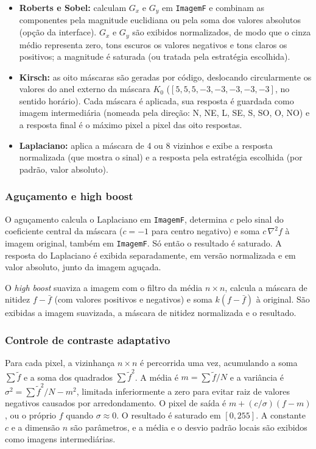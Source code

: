 \documentclass[11pt,a4paper]{article}
\begin{document}
\begin{itemize}
  \item \textbf{Roberts e Sobel:} calculam $G_x$ e $G_y$ em \texttt{ImagemF} e combinam as
        componentes pela magnitude euclidiana ou pela soma dos valores absolutos (opção da
        interface). $G_x$ e $G_y$ são exibidos normalizados, de modo que o cinza médio
        representa zero, tons escuros os valores negativos e tons claros os positivos; a
        magnitude é saturada (ou tratada pela estratégia escolhida).
  \item \textbf{Kirsch:} as oito máscaras são geradas por código, deslocando circularmente os
        valores do anel externo da máscara $K_0$ ($[5, 5, 5, -3, -3, -3, -3, -3]$, no sentido
        horário). Cada máscara é aplicada, sua resposta é guardada como imagem intermediária
        (nomeada pela direção: N, NE, L, SE, S, SO, O, NO) e a resposta final é o máximo
        pixel a pixel das oito respostas.
  \item \textbf{Laplaciano:} aplica a máscara de 4 ou 8 vizinhos e exibe a resposta
        normalizada (que mostra o sinal) e a resposta pela estratégia escolhida (por padrão,
        valor absoluto).
\end{itemize}

\subsubsection{Aguçamento e high boost}

O aguçamento calcula o Laplaciano em \texttt{ImagemF}, determina $c$ pelo sinal do
coeficiente central da máscara ($c = -1$ para centro negativo) e soma $c\,\nabla^2 f$ à imagem
original, também em \texttt{ImagemF}. Só então o resultado é saturado. A resposta do
Laplaciano é exibida separadamente, em versão normalizada e em valor absoluto, junto da imagem
aguçada.

O \textit{high boost} suaviza a imagem com o filtro da média $n \times n$, calcula a máscara de
nitidez $f - \bar f$ (com valores positivos e negativos) e soma $k (f - \bar f)$ à original.
São exibidas a imagem suavizada, a máscara de nitidez normalizada e o resultado.

\subsubsection{Controle de contraste adaptativo}

Para cada pixel, a vizinhança $n \times n$ é percorrida uma vez, acumulando a soma
$\sum \tilde f$ e a soma dos quadrados $\sum \tilde f^2$. A média é $m = \sum \tilde f / N$ e
a variância é $\sigma^2 = \sum \tilde f^2 / N - m^2$, limitada inferiormente a zero para
evitar raiz de valores negativos causados por arredondamento. O pixel de saída é
$m + (c / \sigma)(f - m)$, ou o próprio $f$ quando $\sigma \approx 0$. O resultado é saturado
em $[0, 255]$. A constante $c$ e a dimensão $n$ são parâmetros, e a média e o desvio padrão
locais são exibidos como imagens intermediárias.
\end{document}
